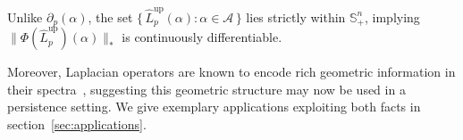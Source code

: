 \documentclass[10pt]{article}
\numberwithin{equation}{section}
\newcommand{\+}{%
	\raisebox{0.18ex}{\scaleobj{0.55}{+}}
}
\theoremstyle{definition}
\theoremstyle{definition}
\newcommand\numberthis{\addtocounter{equation}{1}\tag{\theequation}}
\begin{document}
Unlike $\partial_p(\alpha)$, the set $\{ \, \hat{L}_p^{\mathrm{up}}(\alpha) : \alpha \in \mathcal{A} \, \}$ lies strictly within $\mathbb{S}^n_+$, implying $\lVert \Phi(\hat{L}_p^{\mathrm{up}})(\alpha) \rVert_\ast$ is continuously differentiable. 

Moreover, Laplacian operators are known to encode rich geometric information in their spectra~\cite{horak2013spectra}, suggesting this geometric structure may now be used in a persistence setting. We give exemplary applications exploiting both facts in section~\ref{sec:applications}. 

 


\end{document}
